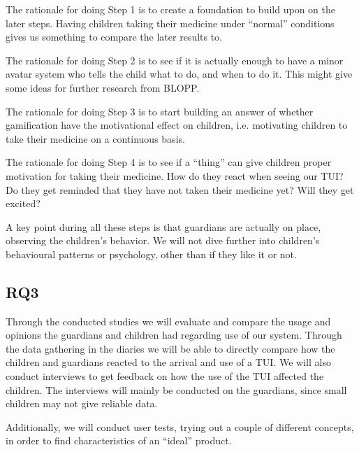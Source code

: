 The rationale for doing Step 1 is to create a foundation to build upon on the later steps. Having children taking their medicine under ``normal'' conditions gives us something to compare the later results to. 


The rationale for doing Step 2 is to see if it is actually enough to have a minor avatar system who tells the child what to do, and when to do it. This might give some ideas for further research from BLOPP. 


The rationale for doing Step 3 is to start building an answer of whether gamification have the motivational effect on children, i.e. motivating children to take their medicine on a continuous basis. 


The rationale for doing Step 4 is to see if a ``thing'' can give children proper motivation for taking their medicine. How do they react when seeing our TUI? Do they get reminded that they have not taken their medicine yet? Will they get excited? 


A key point during all these steps is that guardians are actually on place, observing the children's behavior. We will not dive further into children's behavioural patterns or psychology, other than if they like it or not.    
     
 
\subsection{RQ3}
\label{sec: RQ3-methodology}

Through the conducted studies we will evaluate and compare the usage and opinions the guardians and children had regarding use of our system. Through the data gathering in the diaries we will be able to directly compare how the children and guardians reacted to the arrival and use of a TUI. We will also conduct interviews to get feedback on how the use of the TUI affected the children. The interviews will mainly be conducted on the guardians, since small children may not give reliable data.

Additionally, we will conduct user tests, trying out a couple of different concepts, in order to find characteristics of an ``ideal'' product.  